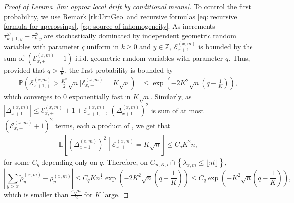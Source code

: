 \documentclass[twoside,12pt, a4paper, final]{article}
\numberwithin{equation}{section}
\theoremstyle{remark}
\newcommand{\abs}[1]{\left\vert #1 \right\vert}
\begin{document}
\begin{proof}[Proof of Lemma~\ref{lm: approx local drift by conditional means}]
		To control the first probability, we use Remark \ref{rk:UrnGeo} and recursive formulas \eqref{eq: recursive formula for upcrossings}, \eqref{eq: source of inhomogeneity}. As increments $\tau^{\mathcal{B}}_{k+1,y} -\tau^{\mathcal{B}}_{k,y}$ are stochastically dominated by independent geometric random variables with parameter $q$ uniform in $ k \geq 0$ and $y \in \mathbb{Z}$, $\mathcal{E}_{x+1,+}^{(x,m)}$ is bounded by the sum of $ (\mathcal{E}_{x,+}^{(x,m)} +1) $ i.i.d. geometric random variables with parameter $q$. 
		Thus, provided that $q> \frac{1}{K}$, the first probability is bounded by
%		
		\begin{align*}
			\mathbb{P}\left(\mathcal{E}_{x+1,+}^{(x,m)} > \frac{K^2}{2} \sqrt{n} | \mathcal{E}_{x,+}^{(x, m)} = K \sqrt{n}\right)
			&\le \exp\left( - 2 K^2 \sqrt{n}(q - \frac{1}{K})  \right) 
			,
		\end{align*}
		which converges to $0$ exponentially fast in $K \sqrt{n}$. Similarly, as $\abs{\Delta_{x+1}^{(x,m)}} \leq  \mathcal{E}_{x,+}^{(x,m)}+1 + \mathcal{E}_{x+1,+}^{(x,m)}$,  $ \left(\Delta_{x+1}^{(x,m)} \right)^2$ is sum of at most $ (\mathcal{E}_{x,+}^{(x,m)}+1)^2$ terms, each a product of , we get that
		\begin{align*}
			\mathbb{E}\left[ \left(\Delta_{x+1}^{(x,m)}\right)^2 \middle| \mathcal{E}_{x,+}^{(x,m)} = K \sqrt{n}  \right]  \leq C_q K^2 n,
		\end{align*}
		for some $C_q$ depending only on $q$.
		Therefore, on $G_{n,K,t} \cap \left\{ \lambda_{x,m} \leq\lfloor nt \rfloor \right\}$,
		\begin{equation}\label{eq: difference of cond means}
			\left| \sum_{y > x} \tilde\rho_y^{(x,m)} - \rho_y^{(x,m)} \right| \le C_q K n^{\frac{1}{2}} \exp\left( - 2K^2 \sqrt{n}(q - \frac{1}{K}) \right) \leq  C_q\exp\left( - K^2 \sqrt{n}(q - \frac{1}{K}) \right), 
		\end{equation}
		which is smaller than $\frac{\varepsilon \sqrt{n}}{2}$ for $K$ large.
		
		

\end{proof}
\end{document}
